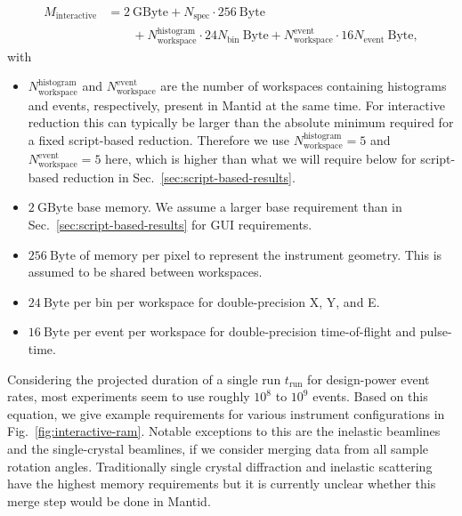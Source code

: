 \documentclass[a4paper,english,numbers=noenddot,bibliography=totoc,chapterprefix=on,DIV=12]{scrartcl}
\newcommand{\Trun}{t_{\text{run}}}
\newcommand{\Nbin}{N_{\text{bin}}}
\newcommand{\Nevent}{N_{\text{event}}}
\newcommand{\Nworkspace}{N_{\text{workspace}}}
\newcommand{\Nspec}{N_{\text{spec}}}
\newcommand{\mantid}{Mantid\xspace}
\begin{document}
\begin{align}
  \label{eq:ram-interactive}
  M_{\text{interactive}} &= 2~\mathrm{GByte} + \Nspec \cdot 256~\mathrm{Byte}\\ &\qquad+ \Nworkspace^{\text{histogram}}\cdot24\Nbin~\mathrm{Byte} + \Nworkspace^{\text{event}}\cdot16\Nevent~\mathrm{Byte},
\end{align}
with
\begin{itemize}
  \item $\Nworkspace^{\text{histogram}}$ and $\Nworkspace^{\text{event}}$ are the number of workspaces containing histograms and events, respectively, present in \mantid at the same time.
    For interactive reduction this can typically be larger than the absolute minimum required for a fixed script-based reduction.
    Therefore we use $\Nworkspace^{\text{histogram}} = 5$ and $\Nworkspace^{\text{event}} = 5$ here, which is higher than what we will require below for script-based reduction in Sec.~\ref{sec:script-based-results}.
  \item $2~\mathrm{GByte}$ base memory.
    We assume a larger base requirement than in Sec.~\ref{sec:script-based-results} for GUI requirements.
  \item $256~\mathrm{Byte}$ of memory per pixel to represent the instrument geometry.
    This is assumed to be shared between workspaces.
  \item $24~\mathrm{Byte}$ per bin per workspace for double-precision X, Y, and E.
  \item $16~\mathrm{Byte}$ per event per workspace for double-precision time-of-flight and pulse-time.
\end{itemize}
Considering the projected duration of a single run $\Trun$ for design-power event rates, most experiments seem to use roughly $10^8$ to $10^9$ events.
Based on this equation, we give example requirements for various instrument configurations in Fig.~\ref{fig:interactive-ram}.
Notable exceptions to this are the inelastic beamlines and the single-crystal beamlines, if we consider merging data from all sample rotation angles.
Traditionally single crystal diffraction and inelastic scattering have the highest memory requirements but it is currently unclear whether this merge step would be done in \mantid.
\end{document}
